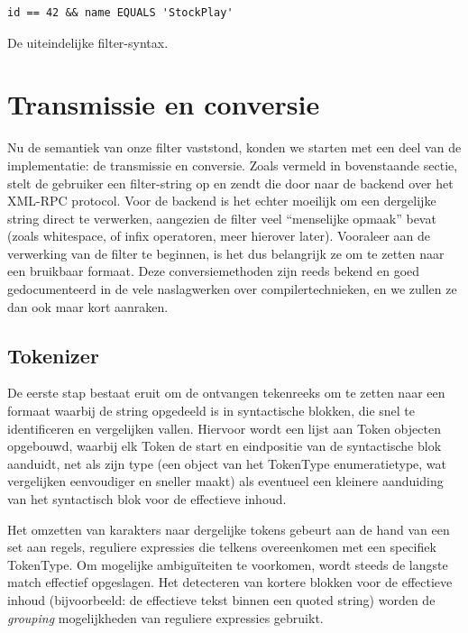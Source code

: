 \begin{code}
\begin{verbatim}
id == 42 && name EQUALS 'StockPlay'
\end{verbatim}
\caption{De uiteindelijke filter-syntax.}
\end{code}


\section{Transmissie en conversie}

Nu de semantiek van onze filter vaststond, konden we starten met een deel van de implementatie: de transmissie en conversie.
Zoals vermeld in bovenstaande sectie, stelt de gebruiker een filter-string op en zendt die door naar de backend over het XML-RPC protocol. Voor de backend is het echter moeilijk om een dergelijke string direct te verwerken, aangezien de filter veel ``menselijke opmaak'' bevat (zoals whitespace, of infix operatoren, meer hierover later). Vooraleer aan de verwerking van de filter te beginnen, is het dus belangrijk ze om te zetten naar een bruikbaar formaat.
Deze conversiemethoden zijn reeds bekend en goed gedocumenteerd in de vele naslagwerken over compilertechnieken, en we zullen ze dan ook maar kort aanraken.

\subsection{Tokenizer}

De eerste stap bestaat eruit om de ontvangen tekenreeks om te zetten naar een formaat waarbij de string opgedeeld is in syntactische blokken, die snel te identificeren en vergelijken vallen. Hiervoor wordt een lijst aan Token objecten opgebouwd, waarbij elk Token de start en eindpositie van de syntactische blok aanduidt, net als zijn type (een object van het TokenType enumeratietype, wat vergelijken eenvoudiger en sneller maakt) als eventueel een kleinere aanduiding van het syntactisch blok voor de effectieve inhoud.

Het omzetten van karakters naar dergelijke tokens gebeurt aan de hand van een set aan regels, reguliere expressies die telkens overeenkomen met een specifiek TokenType. Om mogelijke ambigu\"iteiten te voorkomen, wordt steeds de langste match effectief opgeslagen. Het detecteren van kortere blokken voor de effectieve inhoud (bijvoorbeeld: de effectieve tekst binnen een quoted string) worden de \emph{grouping} mogelijkheden van reguliere expressies gebruikt.

